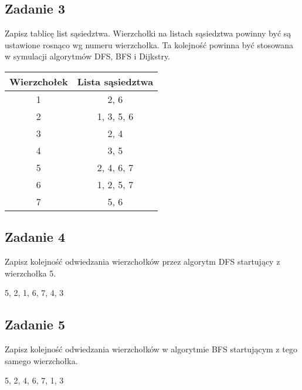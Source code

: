 \documentclass{article}
\begin{document}
\subsection*{Zadanie 3}
Zapisz tablicę list sąsiedztwa. Wierzchołki na listach sąsiedztwa powinny być są ustawione
rosnąco wg numeru wierzchołka. Ta kolejność powinna być stosowana w symulacji algorytmów DFS, BFS i Dijkstry.
\begin{center}
    \begin{tabular}{|c|c|}
        \hline
        Wierzchołek & Lista sąsiedztwa \\
        \hline
        1           & 2, 6             \\
        \hline
        2           & 1, 3, 5, 6       \\
        \hline
        3           & 2, 4             \\
        \hline
        4           & 3, 5             \\
        \hline
        5           & 2, 4, 6, 7       \\
        \hline
        6           & 1, 2, 5, 7       \\
        \hline
        7           & 5, 6             \\
        \hline
    \end{tabular}
\end{center}

\pagebreak
\subsection*{Zadanie 4}
Zapisz kolejność odwiedzania wierzchołków przez algorytm DFS startujący z wierzchołka 5.
\begin{center}
    5, 2, 1, 6, 7, 4, 3
\end{center}

\subsection*{Zadanie 5}
Zapisz kolejność odwiedzania wierzchołków w algorytmie BFS startującym z tego samego
wierzchołka.
\begin{center}
    5, 2, 4, 6, 7, 1, 3
\end{center}
\end{document}
